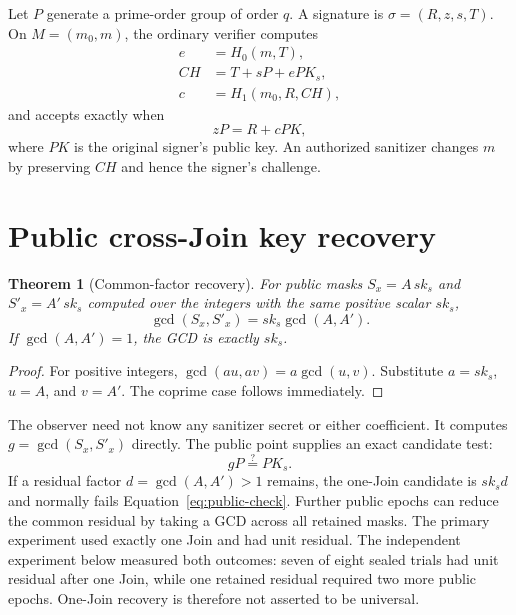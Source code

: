\documentclass[10pt,a4paper]{article}
\newtheorem{theorem}{Theorem}
\begin{document}
Let \(P\) generate a prime-order group of order \(q\). A signature is
\(\sigma=(R,z,s,T)\). On \(M=(m_0,m)\), the ordinary verifier computes
\begin{align}
  e  &= H_0(m,T), \\
  CH &= T+sP+ePK_s,                                  \label{eq:ch}\\
  c  &= H_1(m_0,R,CH),                               \label{eq:challenge}
\end{align}
and accepts exactly when
\begin{equation}
  zP=R+cPK,                                           \label{eq:verify}
\end{equation}
where \(PK\) is the original signer's public key. An authorized sanitizer
changes \(m\) by preserving \(CH\) and hence the signer's challenge.

\section{Public cross-Join key recovery}

\begin{theorem}[Common-factor recovery]
For public masks \(S_x=A\,sk_s\) and \(S'_x=A'\,sk_s\) computed over the
integers with the same positive scalar \(sk_s\),
\[
  \gcd(S_x,S'_x)=sk_s\gcd(A,A').
\]
If \(\gcd(A,A')=1\), the GCD is exactly \(sk_s\).
\end{theorem}

\begin{proof}
For positive integers, \(\gcd(au,av)=a\gcd(u,v)\). Substitute
\(a=sk_s\), \(u=A\), and \(v=A'\). The coprime case follows immediately.
\end{proof}

The observer need not know any sanitizer secret or either coefficient. It
computes \(g=\gcd(S_x,S'_x)\) directly. The public point supplies an exact
candidate test:
\begin{equation}
  gP\stackrel{?}{=}PK_s.                              \label{eq:public-check}
\end{equation}
If a residual factor \(d=\gcd(A,A')>1\) remains, the one-Join candidate is
\(sk_s d\) and normally fails Equation~\eqref{eq:public-check}. Further public
epochs can reduce the common residual by taking a GCD across all retained
masks. The primary experiment used exactly one Join and had unit residual. The
independent experiment below measured both outcomes: seven of eight sealed
trials had unit residual after one Join, while one retained residual required
two more public epochs. One-Join recovery is therefore not asserted to be
universal.
\end{document}
